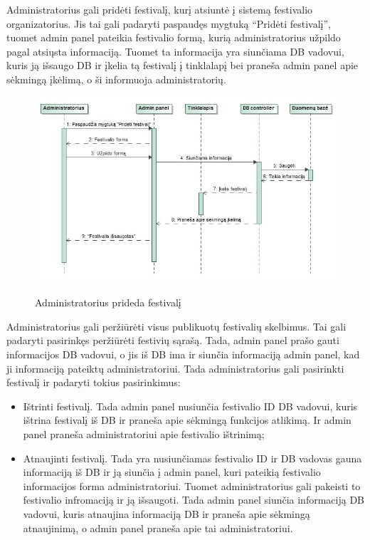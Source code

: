 ﻿\documentclass{VUMIFPSkursinis}
\begin{document}
Administratorius gali pridėti festivalį, kurį atsiuntė į sistemą festivalio organizatorius. Jis tai gali padaryti paspaudęs mygtuką “Pridėti festivalį”, tuomet admin panel pateikia festivalio formą, kurią administratorius užpildo pagal atsiųsta informaciją. Tuomet ta informacija yra siunčiama DB vadovui, kuris ją išsaugo DB ir įkelia tą festivalį į tinklalapį bei praneša admin panel apie sėkmingą įkėlimą, o ši informuoja administratorių.

\begin{figure}[H]
    \centering
    \includegraphics[scale=0.45]{img/Pav/AdminPridetiFestivali}
    \label{img:uml11}
	\caption{Administratorius prideda festivalį}
\end{figure}
	
Administratorius gali peržiūrėti visus publikuotų festivalių skelbimus. Tai gali padaryti pasirinkęs peržiūrėti festivių sąrašą. Tada, admin panel prašo gauti informacijos DB vadovui, o jis iš DB ima ir siunčia informaciją admin panel, kad ji informaciją pateiktų administratoriui. Tada administratorius gali pasirinkti festivalį ir padaryti tokius pasirinkimus: 
\begin{itemize}
\item Ištrinti festivalį. Tada admin panel nusiunčia festivalio ID DB vadovui, kuris ištrina festivalį iš DB ir praneša apie sėkmingą funkcijos atlikimą. Ir admin panel praneša administratoriui apie festivalio ištrinimą;
\item Atnaujinti festivalį. Tada yra nusiunčiamas festivalio ID ir DB vadovas gauna informaciją iš DB ir ją siunčia į admin panel, kuri pateikią festivalio informacijos forma administratoriui. Tuomet administratorius gali pakeisti to festivalio infromaciją ir ją išsaugoti. Tada admin panel siunčia informaciją DB vadovui, kuris atnaujina informaciją DB ir praneša apie sėkmingą atnaujinimą, o admin panel praneša apie tai administratoriui. 
\end{itemize}
	
\end{document}
